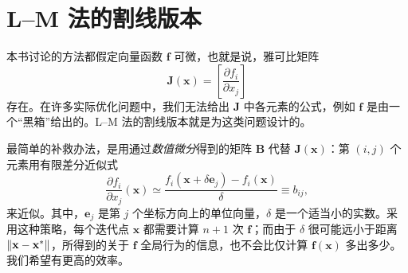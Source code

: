 \section{L--M 法的割线版本}\label{sec:secant-lm}
本书讨论的方法都假定向量函数 $\mathbf f$ 可微，也就是说，雅可比矩阵
\[
  \mathbf J(\mathbf x)=\left[\frac{\partial f_i}{\partial x_j}\right]
\]
存在。在许多实际优化问题中，我们无法给出 $\mathbf J$ 中各元素的公式，例如 $\mathbf f$ 是由一个“黑箱”给出的。L--M 法的割线版本就是为这类问题设计的。

最简单的补救办法，是用通过\emph{数值微分}得到的矩阵 $\mathbf B$ 代替 $\mathbf J(\mathbf x)$：第 $(i,j)$ 个元素用有限差分近似式
\begin{equation}
  \frac{\partial f_i}{\partial x_j}(\mathbf x)
  \simeq \frac{f_i(\mathbf x+\delta\mathbf e_j)-f_i(\mathbf x)}{\delta}
  \equiv b_{ij},
  \tag{3.28}\label{eq:3.28}
\end{equation}
来近似。其中，$\mathbf e_j$ 是第 $j$ 个坐标方向上的单位向量，$\delta$ 是一个适当小的实数。采用这种策略，每个迭代点 $\mathbf x$ 都需要计算 $n+1$ 次 $\mathbf f$；而由于 $\delta$ 很可能远小于距离 $\lVert\mathbf x-\mathbf x^*\rVert$，所得到的关于 $\mathbf f$ 全局行为的信息，也不会比仅计算 $\mathbf f(\mathbf x)$ 多出多少。我们希望有更高的效率。


